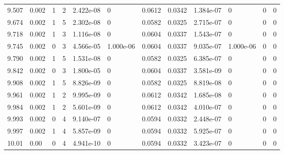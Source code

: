 \documentclass[preview]{standalone}
\begin{document}
{{{\begin{tabular}{L{1.2cm}C{1.2cm} C{0.3cm}C{0.5cm} C{1.4cm}C{1.4cm} C{1.4cm}C{1.4cm} C{1.6cm}C{1.6cm} C{1.6cm}C{1.6cm}}
  9.507  &  0.002  & 1     &  2 &  2.422e-08  & 0  &  0.0612&   0.0342& 1.384e-07 & 0   &  0 & 0  \\ 
  9.674  &  0.002  & 1     &  5 &  2.302e-08  & 0  &  0.0582&   0.0325& 2.715e-07 & 0   &  0 & 0  \\ 
  9.718  &  0.002  & 1     &  3 &  1.116e-08  & 0  &  0.0604&   0.0337& 1.543e-07 & 0   &  0 & 0  \\ 
  9.745  &  0.002  & 0     &  3 &  4.566e-05  & 1.000e-06  &  0.0604&   0.0337& 9.035e-07 & 1.000e-06   &  0 & 0  \\ 
  9.790  &  0.002  & 1     &  5 &  1.531e-08  & 0  &  0.0582&   0.0325& 6.385e-07 & 0   &  0 & 0  \\ 
  9.842  &  0.002  & 0     &  3 &  1.800e-05  & 0  &  0.0604&   0.0337& 3.581e-09 & 0   &  0 & 0  \\ 
  9.908  &  0.002  & 1     &  5 &  8.826e-09  & 0  &  0.0582&   0.0325& 8.819e-08 & 0   &  0 & 0  \\ 
  9.961  &  0.002  & 1     &  2 &  9.995e-09  & 0  &  0.0612&   0.0342& 1.685e-08 & 0   &  0 & 0  \\ 
  9.984  &  0.002  & 1     &  2 &  5.601e-09  & 0  &  0.0612&   0.0342& 4.010e-07 & 0   &  0 & 0  \\ 
  9.993  &  0.002  & 0     &  4 &  9.140e-07  & 0  &  0.0594&   0.0332& 2.448e-07 & 0   &  0 & 0  \\ 
  9.997  &  0.002  & 1     &  4 &  5.857e-09  & 0  &  0.0594&   0.0332& 5.925e-07 & 0   &  0 & 0  \\ 
  10.01  &  0.00  & 0     &  4 &  4.941e-10  & 0  &  0.0594&   0.0332& 3.423e-07 & 0   &  0 & 0  \\ 
\hline 
\end{tabular} 

}}}
\end{document}
